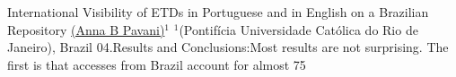 \begin{abstract_online}{International Visibility of ETDs in Portuguese and in English on a Brazilian Repository}{%
        \underline{(Anna B Pavani)}$^{1}$}{%
        }{%
        $^1$(Pontifícia Universidade Católica do Rio de Janeiro), Brazil}
      04.Results and Conclusions:Most results are not surprising. The first is that accesses from Brazil account for almost 75%
    
    \end{abstract_online}
    
